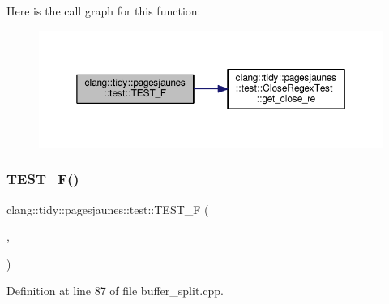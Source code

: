 Here is the call graph for this function\+:
\nopagebreak
\begin{figure}[H]
\begin{center}
\leavevmode
\includegraphics[width=350pt]{namespaceclang_1_1tidy_1_1pagesjaunes_1_1test_ab46676a22ac6f764d809938617f4c9e1_cgraph}
\end{center}
\end{figure}
\mbox{\label{namespaceclang_1_1tidy_1_1pagesjaunes_1_1test_ae0602bb639990d9c0c7f823d5d187fc3}} 
\subsubsection{\texorpdfstring{T\+E\+S\+T\+\_\+\+F()}{TEST\_F()}\hspace{0.1cm}{\footnotesize\ttfamily [20/57]}}
{\footnotesize\ttfamily clang\+::tidy\+::pagesjaunes\+::test\+::\+T\+E\+S\+T\+\_\+F (\begin{DoxyParamCaption}\item[{\hyperlink{classclang_1_1tidy_1_1pagesjaunes_1_1test_1_1_buffer_split_test}{Buffer\+Split\+Test}}]{,  }\item[{Nominal\+Buffer\+Split}]{ }\end{DoxyParamCaption})}



Definition at line 87 of file buffer\+\_\+split.\+cpp.

